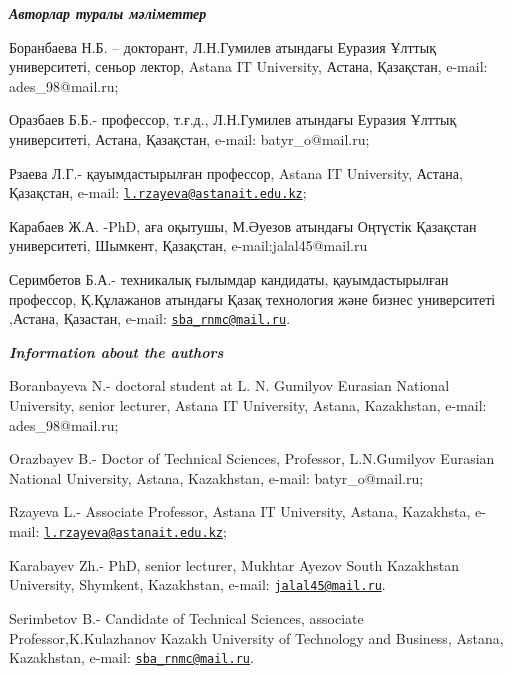 \begin{authorinfo}
\hspace{1em}\emph{{\bfseries Авторлар туралы мәліметтер}}

Боранбаева Н.Б. -- докторант, Л.Н.Гумилев атындағы Еуразия Ұлттық
университеті, сеньор лектор, Astana IT University, Астана, Қазақстан,
e-mail: ades\_98@mail.ru;

Оразбаев Б.Б.- профессор, т.ғ.д., Л.Н.Гумилев атындағы Еуразия Ұлттық
университеті, Астана, Қазақстан, e-mail: batyr\_o@mail.ru;

Рзаева Л.Г.- қауымдастырылған профессор, Astana IT University, Астана,
Қазақстан, e-mail:
\href{mailto:l.rzayeva@astanait.edu.kz}{\nolinkurl{l.rzayeva@astanait.edu.kz}};

Карабаев Ж.А. -PhD, аға оқытушы, М.Әуезов атындағы Оңтүстік Қазақстан
университеті, Шымкент, Қазақстан, e-mail:jalal45@mail.ru

Серимбетов Б.А.- техникалық ғылымдар кандидаты, қауымдастырылған
профессор, Қ.Құлажанов атындағы Қазақ технология және бизнес
университеті ,Астана, Қазастан, e-mail:
\href{mailto:sba_rnmc@mail.ru}{\nolinkurl{sba\_rnmc@mail.ru}}.

\hspace{1em}\emph{{\bfseries Information about the authors}}

Boranbayeva N.- doctoral student at L. N. Gumilyov Eurasian National
University, senior lecturer, Astana IT University, Astana, Kazakhstan,
e-mail: ades\_98@mail.ru;

Orazbayev B.- Doctor of Technical Sciences, Professor, L.N.Gumilyov
Eurasian National University, Astana, Kazakhstan, e-mail:
batyr\_o@mail.ru;

Rzayeva L.- Associate Professor, Astana IT University, Astana,
Kazakhsta, e-mail:
\href{mailto:l.rzayeva@astanait.edu.kz}{\nolinkurl{l.rzayeva@astanait.edu.kz}};

Karabayev Zh.- PhD, senior lecturer, Mukhtar Ayezov South Kazakhstan
University, Shymkent, Kazakhstan, e-mail:
\href{mailto:jalal45@mail.ru}{\nolinkurl{jalal45@mail.ru}}.

Serimbetov B.- Candidate of Technical Sciences, associate
Professor,K.Kulazhanov Kazakh University of Technology and Business,
Astana, Kazakhstan, e-mail:
\href{mailto:sba_rnmc@mail.ru}{\nolinkurl{sba\_rnmc@mail.ru}}.
\end{authorinfo}
